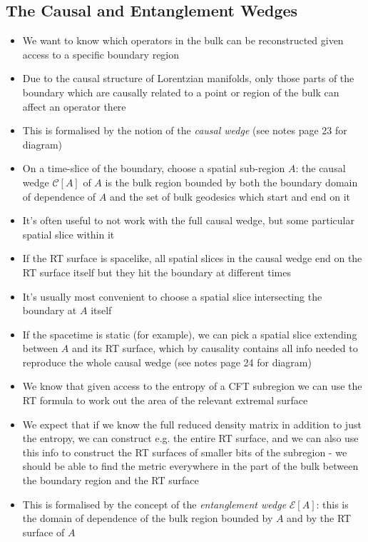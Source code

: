 \documentclass[12pt,a4paper]{article}
\numberwithin{equation}{section}
\begin{document}
	\subsection{The Causal and Entanglement Wedges}
	\begin{itemize}
		\item We want to know which operators in the bulk can be reconstructed given access to a specific boundary region
		\item Due to the causal structure of Lorentzian manifolds, only those parts of the boundary which are causally related to a point or region of the bulk can affect an operator there
		\item This is formalised by the notion of the \textit{causal wedge} (see notes page 23 for diagram)
		\item On a time-slice of the boundary, choose a spatial sub-region $A$: the causal wedge $\mathcal{C}[A]$ of $A$ is the bulk region bounded by both the boundary domain of dependence of $A$ and the set of bulk geodesics which start and end on it
		\item It's often useful to not work with the full causal wedge, but some particular spatial slice within it
		\item If the RT surface is spacelike, all spatial slices in the causal wedge end on the RT surface itself but they hit the boundary at different times
		\item It's usually most convenient to choose a spatial slice intersecting the boundary at $A$ itself
		\item If the spacetime is static (for example), we can pick a spatial slice extending between $A$ and its RT surface, which by causality contains all info needed to reproduce the whole causal wedge (see notes page 24 for diagram)
		\item We know that given access to the entropy of a CFT subregion we can use the RT formula to work out the area of the relevant extremal surface
		\item We expect that if we know the full reduced density matrix in addition to just the entropy, we can construct e.g. the entire RT surface, and we can also use this info to construct the RT surfaces of smaller bits of the subregion - we should be able to find the metric everywhere in the part of the bulk between the boundary region and the RT surface
		\item This is formalised by the concept of the \textit{entanglement wedge} $\mathcal{E}[A]$: this is the domain of dependence of the bulk region bounded by $A$ and by the RT surface of $A$

\end{itemize}
\end{document}
